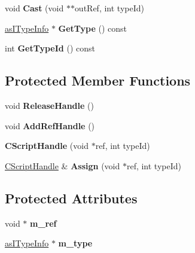 \begin{DoxyCompactItemize}
\item 
\mbox{\label{class_c_script_handle_a7b233adf9ca41ac1bd1d7e1a550ec247}} 
void {\bfseries Cast} (void $\ast$$\ast$out\+Ref, int type\+Id)
\item 
\mbox{\label{class_c_script_handle_a2cd3503ab8df39d800cc3d31d6572995}} 
\hyperlink{classas_i_type_info}{as\+I\+Type\+Info} $\ast$ {\bfseries Get\+Type} () const
\item 
\mbox{\label{class_c_script_handle_a8add0ff15fabf3280b73d675d9e2f69d}} 
int {\bfseries Get\+Type\+Id} () const
\end{DoxyCompactItemize}
\subsection*{Protected Member Functions}
\begin{DoxyCompactItemize}
\item 
\mbox{\label{class_c_script_handle_adc970bede7a56d5375ef9c984259cd69}} 
void {\bfseries Release\+Handle} ()
\item 
\mbox{\label{class_c_script_handle_abf6ba97d329f49ce21cfffcd194a496a}} 
void {\bfseries Add\+Ref\+Handle} ()
\item 
\mbox{\label{class_c_script_handle_a896b317b74d595bee6b790f9ae03283d}} 
{\bfseries C\+Script\+Handle} (void $\ast$ref, int type\+Id)
\item 
\mbox{\label{class_c_script_handle_a28086975d4fdc54bf489c528aad5b25e}} 
\hyperlink{class_c_script_handle}{C\+Script\+Handle} \& {\bfseries Assign} (void $\ast$ref, int type\+Id)
\end{DoxyCompactItemize}
\subsection*{Protected Attributes}
\begin{DoxyCompactItemize}
\item 
\mbox{\label{class_c_script_handle_ae7b95718bf935d5e91aaf7d65607c7be}} 
void $\ast$ {\bfseries m\+\_\+ref}
\item 
\mbox{\label{class_c_script_handle_af0a9c74e3f724b0721275c80816af3ba}} 
\hyperlink{classas_i_type_info}{as\+I\+Type\+Info} $\ast$ {\bfseries m\+\_\+type}
\end{DoxyCompactItemize}
